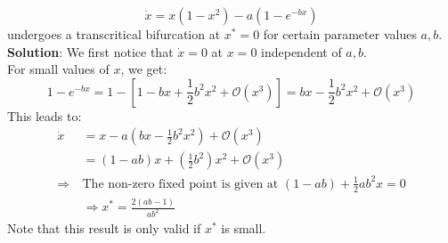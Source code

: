 \begin{equation*}
	\dot{x}=x(1-x^2)-a\left(1-e^{-bx}\right)
\end{equation*}
undergoes a transcritical bifurcation at $x^\ast=0$ for certain parameter values $a,b$.\\
\textbf{Solution}: We first notice that $\dot{x}=0$ at $x=0$ independent of $a,b$.\\
For small values of $x$, we get:
\begin{equation*}
	1-e^{-bx}=1-\left[1-bx+\frac{1}{2}b^2x^2+\mathcal{O}\left(x^3\right)\right]=bx-\frac{1}{2}b^2x^2+\mathcal{O}\left(x^3\right)
\end{equation*}
This leads to:
\begin{align*}
	\dot{x}&=x-a\left(bx-\frac{1}{2}b^2x^2\right)+\mathcal{O}\left(x^3\right)\\
	&=(1-ab)x+\left(\frac{1}{2}b^2\right)x^2+\mathcal{O}\left(x^3\right)\\
	\Rightarrow\ &\text{The non-zero fixed point is given at } (1-ab)+\frac{1}{2}ab^2x=0\\
	&\Rightarrow x^\ast=\frac{2(ab-1)}{ab^2}
\end{align*}
Note that this result is only valid if $x^\ast$ is small.\vspace{0.5 cm}\\
